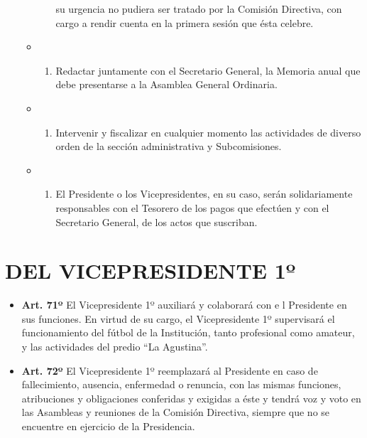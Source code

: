 \documentclass[]{book}
\providecommand{\tightlist}{%
  \setlength{\itemsep}{0pt}\setlength{\parskip}{0pt}}
\begin{document}
\begin{itemize}
\begin{itemize}
\begin{enumerate}
      su urgencia no pudiera ser tratado por la Comisión Directiva, con
      cargo a rendir cuenta en la primera sesión que ésta celebre.
    \end{enumerate}
  \item
    \begin{enumerate}
    \def\labelenumi{\alph{enumi})}
    \setcounter{enumi}{10}
    \tightlist
    \item
      Redactar juntamente con el Secretario General, la Memoria anual
      que debe presentarse a la Asamblea General Ordinaria.
    \end{enumerate}
  \item
    \begin{enumerate}
    \def\labelenumi{\alph{enumi})}
    \setcounter{enumi}{11}
    \tightlist
    \item
      Intervenir y fiscalizar en cualquier momento las actividades de
      diverso orden de la sección administrativa y Subcomisiones.
    \end{enumerate}
  \item
    \begin{enumerate}
    \def\labelenumi{\alph{enumi})}
    \setcounter{enumi}{12}
    \tightlist
    \item
      El Presidente o los Vicepresidentes, en su caso, serán
      solidariamente responsables con el Tesorero de los pagos que
      efectúen y con el Secretario General, de los actos que suscriban.
    \end{enumerate}
  \end{itemize}
\end{itemize}

\chapter{DEL VICEPRESIDENTE 1º}\label{del-vicepresidente-1}

\begin{itemize}
\item
  \textbf{Art. 71º} El Vicepresidente 1º auxiliará y colaborará con e l
  Presidente en sus funciones. En virtud de su cargo, el Vicepresidente
  1º supervisará el funcionamiento del fútbol de la Institución, tanto
  profesional como amateur, y las actividades del predio ``La
  Agustina''.
\item
  \textbf{Art. 72º} El Vicepresidente 1º reemplazará al Presidente en
  caso de fallecimiento, ausencia, enfermedad o renuncia, con las mismas
  funciones, atribuciones y obligaciones conferidas y exigidas a éste y
  tendrá voz y voto en las Asambleas y reuniones de la Comisión
  Directiva, siempre que no se encuentre en ejercicio de la Presidencia.
\end{itemize}
\end{document}
